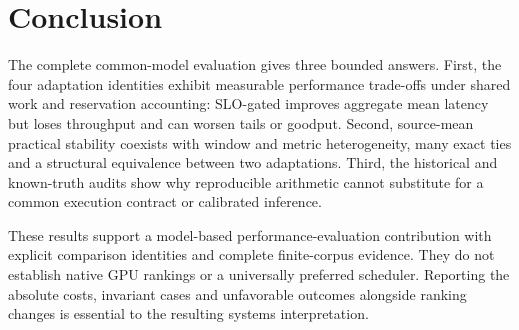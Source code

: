 \section{Conclusion}
The complete common-model evaluation gives three bounded answers.
First, the four adaptation identities exhibit measurable performance
trade-offs under shared work and reservation accounting: SLO-gated improves
aggregate mean latency but loses throughput and can worsen tails or
goodput. Second, source-mean practical stability coexists with window and
metric heterogeneity, many exact ties and a structural equivalence between
two adaptations. Third, the historical and known-truth audits show why
reproducible arithmetic cannot substitute for a common execution contract
or calibrated inference.

These results support a model-based performance-evaluation contribution
with explicit comparison identities and complete finite-corpus evidence.
They do not establish native GPU rankings or a universally preferred
scheduler. Reporting the absolute costs, invariant cases and unfavorable
outcomes alongside ranking changes is essential to the resulting systems
interpretation.
